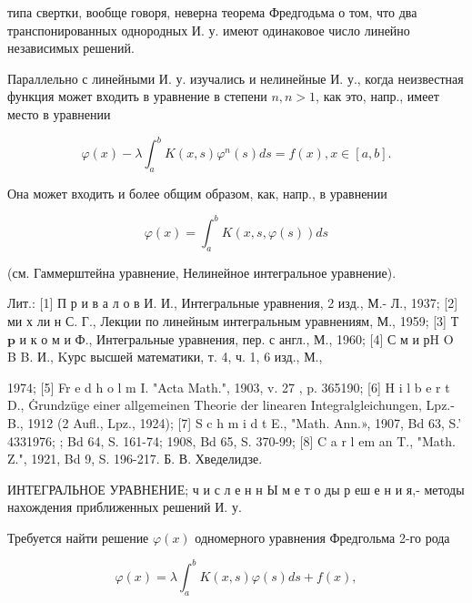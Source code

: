 \documentclass[10pt]{article}
\begin{document}
типа свертки, вообще говоря, неверна теорема Фредгодьма о том, что два транспонированных однородных И. у. имеют одинаковое число линейно независимых решений.



Параллельно с линейными И. у. изучались и нелинейные И. у., когда неизвестная функция может входить в уравнение в степени $n, n>1$, как это, напр., имеет место в уравнении



\[

\varphi(x)-\lambda \int_{a}^{b} K(x, s) \varphi^{n}(s) d s=f(x), x \in[a, b] .

\]



Она может входить и более общим образом, как, напр., в уравнении



\[

\varphi(x)=\int_{a}^{b} K(x, s, \varphi(s)) d s

\]



(см. Гаммерштейна уравнение, Нелинейное интегральное уравнение).



Лит.: [1] П р и в а л о в И. И., Интегральные уравнения, 2 изд., М.- Л., 1937; [2] ми х ли н С. Г., Лекции по линейным интегральным уравнениям, М., 1959; [3] Т $\mathbf{p}$ и к о м и Ф., Интегральные уравнения, пер. с англ., М., 1960; [4] С м и рH O B B. И., Kурс высшей математики, т. 4, ч. 1, 6 изд., М.,

1974; [5] Fr e d h o l m I. "Acta Math.", 1903, v. 27 , p. 365190; [6] H i l b e r t D., Ġrundzüge einer allgemeinen Theorie der linearen Integralgleichungen, Lpz.-B., 1912 (2 Aufl., Lpz., 1924); [7] S c h m i d t E., "Math. Ann.», 1907, Bd 63, S.' 4331976; ; Bd 64, S. 161-74; 1908, Bd 65, S. 370-99; [8] C a r l em an T., "Math. Z.", 1921, Bd 9, S. 196-217. Б. В. Хведелидзе.



ИНТЕГРАЛЬНОЕ УРАВНЕНИЕ; ч и с л е н н Ы м е т о ды р еш е н и я,- методы нахождения приближенных решений И. у.



Требуется найти решение $\varphi(x)$ одномерного уравнения Фредгольма 2-го рода



\[

\varphi(x)=\lambda \int_{a}^{b} K(x, s) \varphi(s) d s+f(x),

\]
\end{document}
